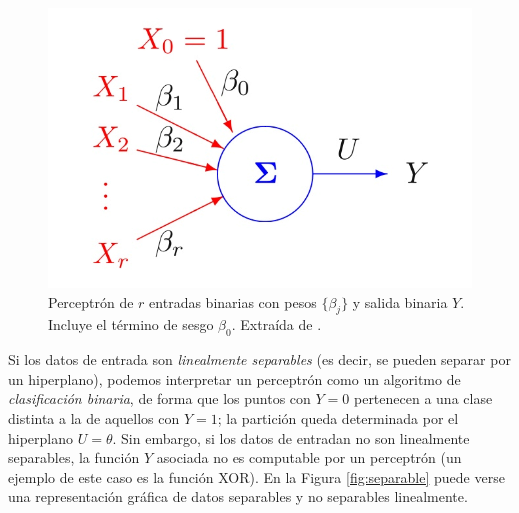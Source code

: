 \documentclass[
  a4paper,
  12pt,
  spanish,
]{scrartcl}
\theoremstyle{teorema-style}
\begin{document}
\begin{figure}[h]
  \centering
  \includegraphics[width=.7\textwidth]{img/perceptron}
  \caption{Perceptrón de $r$ entradas binarias con pesos $\{\beta_j\}$ y salida binaria $Y$. Incluye el término de sesgo $\beta_0$. Extraída de \parencite{izenman_modern_2008}.}
  \label{fig:perceptron}
\end{figure}

Si los datos de entrada son \textit{linealmente separables} (es decir, se pueden separar por un hiperplano), podemos interpretar un perceptrón como un algoritmo de \textit{clasificación binaria}, de forma que los puntos con $Y=0$ pertenecen a una clase distinta a la de aquellos con $Y=1$; la partición queda determinada por el hiperplano $U=\theta$. Sin embargo, si los datos de entradan no son linealmente separables, la función $Y$ asociada no es computable por un perceptrón (un ejemplo de este caso es la función XOR). En la Figura \ref{fig:separable} puede verse una representación gráfica de datos separables y no separables linealmente.
\end{document}
